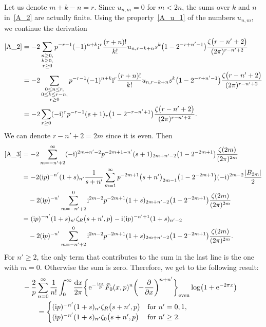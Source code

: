 \documentclass[10pt,a4paper]{amsart}
\numberwithin{equation}{section}
\begin{document}
Let us denote $m+k-n=r$. Since $u_{n, m}=0$ for $m<2n$, the sums over $k$ and $n$ in~\eqref{A_2} are actually finite. Using the property~\eqref{A_u_1} of the numbers $u_{n, m}$, we continue the derivation
\begin{align}
\eqref{A_2}&{}=-2\sum_{\substack{n \geq 0,\\ k \geq 0,\\ r \geq 0}} p^{-r-1} (-1)^{n+k} {\rm i}^{r} \frac{(r+n)!}{k!} u_{n, r-k+n} s^k \bigl(1-2^{-r+n'-1}\bigr) \frac{\zeta\bigl(r-n'+2\bigr)}{(2\pi)^{r-n'+2}}\nonumber\\
           &{}=-2\sum_{\substack{0 \leq n \leq r,\\ 0 \leq k \leq r-n, \\ r \geq 0}} p^{-r-1} (-1)^{n+k} {\rm i}^{r} \frac{(r+n)!}{k!} u_{n, r-k+n} s^k \bigl(1-2^{-r+n'-1}\bigr) \frac{\zeta\bigl(r-n'+2\bigr)}{(2\pi)^{r-n'+2}}\cr
           &{}=-2\sum_{r \geq 0} (-{\rm i})^{r} p^{-r-1} (s+1)_r \bigl(1-2^{-r-n'+1}\bigr)\frac{\zeta\bigl(r-n'+2\bigr)}{(2\pi)^{r-n'+2}}.\label{A_3}
\end{align}
We can denote $r-n'+2=2m$ since it is even. Then
\begin{align*}
\eqref{A_3}&=-2\sum_{m=-n'+2}^{\infty} (-{\rm i})^{2m+n'-2} p^{-2m+1-n'} (s+1)_{2m+n'-2} \bigl(1-2^{-2m+1}\bigr)\frac{\zeta(2m)}{(2\pi)^{2m}}\\
                     &=-2({\rm i}p)^{-n'}(1+s)_{n'}\frac{1}{s+n'}\sum_{m=1}^{\infty} p^{-2m+1} \bigl(s+n'\bigr)_{2m-1} \bigl(1-2^{-2m+1}\bigr) (-{\rm i})^{2m-2} \frac{|B_{2m}|}{2}\cr
                     &\quad{} -2({\rm i}p)^{-n'} \sum_{m=-n'+2}^{0} {\rm i}^{2m-2} p^{-2m+1} (1+s)_{2m+n'-2} \bigl(1-2^{-2m+1}\bigr)\frac{\zeta(2m)}{(2\pi)^{2m}} \cr
                     &=({\rm i}p)^{-n'} (1+s)_{n'} \zeta_{R}\bigl(s+n', p\bigr)-{\rm i}({\rm i}p)^{-n'+1}(1+s)_{n'-2}\cr
                     &\quad{} -2({\rm i}p)^{-n'} \sum_{m=-n'+2}^{0} {\rm i}^{2m-2} p^{-2m+1} (1+s)_{2m+n'-2} \bigl(1-2^{-2m+1}\bigr)\frac{\zeta(2m)}{(2\pi)^{2m}} .\nonumber
\end{align*}
For $n'\geq2$, the only term that contributes to the sum in the last line is the one with $m=0$. Otherwise the sum is zero. Therefore, we get to the following result:
\begin{align}
&-\frac{2}{p} \sum_{n=0}^{\infty} \frac{1}{n!} \int_{0}^{\infty} \frac{{\rm d}x}{2\pi} \biggl\{ {\rm e}^{-\frac{{\rm i}sx}{p}} \bar{F}_0(x, p)^n \biggl(-\frac{\partial}{\partial x}\biggr)^{n+n'} \biggr\}_{\text{even}} \log\bigl(1+{\rm e}^{-2\pi x}\bigr) \cr
&\qquad =
\begin{cases}
({\rm i}p)^{-n'} (1+s)_{n'} \zeta_{R}\bigl(s+n', p\bigr) & \text{for } n'=0, 1, \\
({\rm i}p)^{-n'} (1+s)_{n'} \zeta_{0}\bigl(s+n', p\bigr) & \text{for } n'\geq 2.
\end{cases}\label{A_Integral_Answer}
\end{align}
\end{document}

